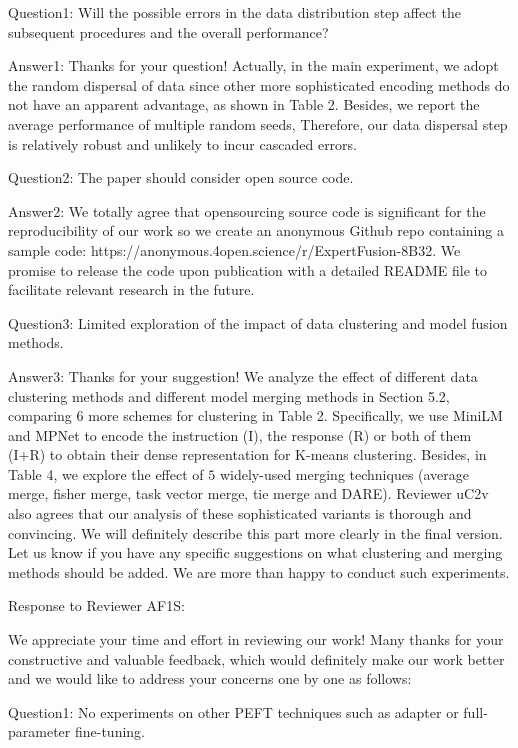 Question1: Will the possible errors in the data distribution step affect the subsequent procedures and the overall performance?
 

Answer1: Thanks for your question! Actually, in the main experiment, we adopt the random dispersal of data since other more sophisticated encoding methods do not have an apparent advantage, as shown in Table 2. Besides, we report the average performance of multiple random seeds, Therefore, our data dispersal step is relatively robust and unlikely to incur cascaded errors. 


Question2: The paper should consider open source code.

Answer2: We totally agree that opensourcing source code is significant for the reproducibility of our work so we create an anonymous Github repo containing a sample code: https://anonymous.4open.science/r/ExpertFusion-8B32. We promise to release the code upon publication with a detailed README file to facilitate relevant research in the future. 



Question3: Limited exploration of the impact of data clustering and model fusion methods.

Answer3: Thanks for your suggestion! We analyze the effect of different data clustering methods and different model merging methods in Section 5.2, comparing $6$ more schemes for clustering in Table 2. Specifically, we use MiniLM and MPNet to encode the instruction (I), the response (R) or both of them (I+R) to obtain their dense representation for K-means clustering. Besides, in Table 4, we explore the effect of $5$ widely-used merging techniques (average merge, fisher merge, task vector merge, tie merge and DARE). Reviewer uC2v also agrees that our analysis of these sophisticated variants is thorough and convincing. We will definitely describe this part more clearly in the final version. Let us know if you have any specific suggestions on what clustering and merging methods should be added. We are more than happy to conduct such experiments.




Response to Reviewer AF1S:

We appreciate your time and effort in reviewing our work! Many thanks for your constructive and valuable feedback, which would definitely make our work better and we would like to address your concerns one by one as follows:

Question1: No experiments on other PEFT techniques such as adapter or full-parameter fine-tuning.

